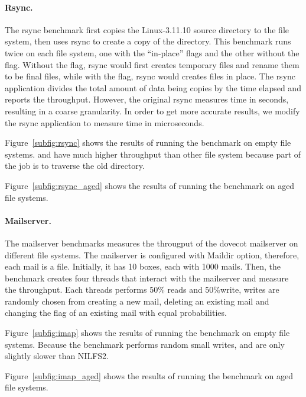\paragraph{Rsync.}

The rsync benchmark first copies the Linux-3.11.10 source directory to the file
system, then uses rsync to create a copy of the directory.
This benchmark runs twice on each file system, one with the ``in-place'' flags
and the other without the flag.
Without the flag, rsync would first creates temporary files and rename them to
be final files, while with the flag, rsync would creates files in place.
The rsync application divides the total amount of data being copies by the time
elapsed and reports the throughput.
However, the original rsync measures time in seconds, resulting in a coarse
granularity.
In order to get more accurate results, we modify the rsync application to
measure time in microseconds.

Figure~\ref{subfig:rsync} shows the results of running the benchmark on empty
file systems.
\betrfsFour and \betrfsFive have much higher throughput than other file system
because part of the job is to traverse the old directory.

Figure~\ref{subfig:rsync_aged} shows the results of running the benchmark on
aged file systems.

\paragraph{Mailserver.}

The mailserver benchmarks measures the througput of the dovecot mailserver on
different file systems.
The mailserver is configured with Maildir option, therefore, each mail is a
file.
Initially, it has 10 boxes, each with 1000 mails.
Then, the benchmark creates four threads that interact with the mailserver and
measure the throughput.
Each threads performs 50\% reads and 50\%write, writes are randomly chosen from
creating a new mail, deleting an existing mail and changing the flag of an
existing mail with equal probabilities.

Figure~\ref{subfig:imap} shows the results of running the benchmark on empty file
systems.
Because the benchmark performs random small writes, \betrfsFour and \betrfsFive
are only slightly slower than NILFS2.

Figure~\ref{subfig:imap_aged} shows the results of running the benchmark on
aged file systems.

